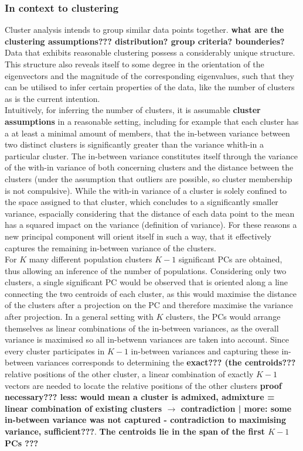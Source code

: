\documentclass[a4paper, 11pt]{article}
\begin{document}
\subsubsection{In context to clustering}
Cluster analysis intends to group similar data points together. \textbf{what are the clustering assumptions??? distribution? group criteria? bounderies?}
Data that exhibits reasonable clustering possess a considerably unique structure. This structure also reveals itself to some degree in the orientation of the eigenvectors and the magnitude of the corresponding eigenvalues, such that they can be utilised to infer certain properties of the data, like the number of clusters as is the current intention. \\
Intuitively, for inferring the number of clusters, it is assumable \textbf{cluster assumptions} in a reasonable setting, including for example that each cluster has a at least a minimal amount of members, that the in-between variance between two distinct clusters is significantly greater than the variance whith-in a particular cluster. The in-between variance constitutes itself through the variance of the with-in variance of both concerning clusters and the distance between the clusters (under the assumption that outliers are possible, so cluster membership is not compulsive). While the with-in variance of a cluster is solely confined to the space assigned to that cluster, which concludes to a significantly smaller variance, espacially considering that the distance of each data point to the mean has a squared impact on the variance (definition of variance). For these reasons a new principal component will orient itself in such a way, that it effectively captures the remaining in-between variance of the clusters. \\
For $K$ many different population clusters $K-1$ significant PCs are obtained, thus allowing an inference of the number of populations. Considering only two clusters, a single significant PC would be observed that is oriented along a line connecting the two centroids of each cluster, as this would maximise the distance of the clusters after a projection on the PC and therefore maximise the variance after projection. In a general setting with $K$ clusters, the PCs would arrange themselves as linear combinations of the in-between variances, as the overall variance is maximised so all in-betwenn variances are taken into account. Since every cluster participates in $K-1$ in-between variances and capturing these in-between variances corresponds to determining the \textbf{exact??? (the centroids???} relative positions of the other cluster, a linear combination of exactly $K-1$ vectors are needed to locate the relative positions of the other clusters \textbf{proof necessary??? less: would mean a cluster is admixed, admixture = linear combination of existing clusters $\rightarrow$ contradiction | more: some in-between variance was not captured - contradiction to maximising variance, sufficient???}. \textbf{The centroids lie in the span of the first $K-1$ PCs ???}
\end{document}

